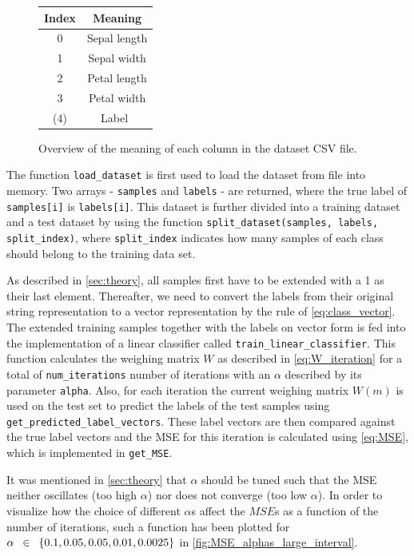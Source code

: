 \documentclass{article}
\begin{document}
\begin{figure}
    \centering
    \begin{tabular}{ | c | c | }
        \hline
        Index & Meaning \\
        \hline
        0 & Sepal length \\
        1 & Sepal width \\
        2 & Petal length \\
        3 & Petal width \\
        (4) & Label \\
        \hline
    \end{tabular}
    \caption{Overview of the meaning of each column in the dataset CSV file.}
    \label{tab:class_vectors}
\end{figure}

The function \lstinline{load_dataset} is first used to load the dataset from file into memory.
Two arrays - \lstinline{samples} and \lstinline{labels} - are returned, where the true label of
\lstinline{samples[i]} is \lstinline{labels[i]}. This dataset is further divided into a training
dataset and a test  dataset by using the function \lstinline{split_dataset(samples, labels, split_index)},
where \lstinline{split_index} indicates how many samples of each class should belong to the training
data set.

As described in \autoref{sec:theory}, all samples first have to be extended with a 1 as their last element.
Thereafter, we need to convert the labels from their original string representation to a vector
representation by the rule of \eqref{eq:class_vector}. The extended training samples together with
the labels on vector form is fed into the implementation of a linear classifier called
\lstinline{train_linear_classifier}. This function calculates the weighing matrix $W$ as described in
\eqref{eq:W_iteration} for a total of \lstinline{num_iterations} number of iterations with an $\alpha$
described by its parameter \lstinline{alpha}. Also, for each iteration the current weighing matrix
$W(m)$ is used on the test set to predict the labels of the test samples using
\lstinline{get_predicted_label_vectors}. These label vectors are then compared against the true
label vectors and the MSE for this iteration is calculated using \eqref{eq:MSE}, which is implemented
in \lstinline{get_MSE}.

It was mentioned in \autoref{sec:theory} that $\alpha$ should be tuned such that the MSE neither
oscillates (too high $\alpha$) nor does not converge (too low $\alpha$). In order to visualize
how the choice of different $\alpha$s affect the $MSE$s as a function of the number of iterations,
such a function has been plotted for $\alpha \enskip \in \enskip \{0.1, 0.05, 0.05, 0.01, 0.0025\}$
in \autoref{fig:MSE_alphas_large_interval}.
\end{document}

